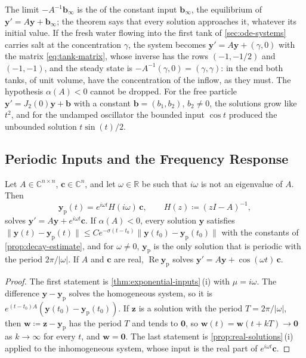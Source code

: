 The limit $-A^{-1}\mathbf b_\infty$ is the  of the constant input $\mathbf b_\infty$, the equilibrium of $\mathbf y'=A\mathbf y+\mathbf b_\infty$; the theorem says that every solution approaches it, whatever its initial value. If the fresh water flowing into the first tank of \cref{sec:ode-systems} carries salt at the concentration $\gamma$, the system becomes $\mathbf y'=A\mathbf y+(\gamma,0)$ with the matrix \eqref{eq:tank-matrix}, whose inverse has the rows $(-1,-1/2)$ and $(-1,-1)$, and the steady state is $-A^{-1}(\gamma,0)=(\gamma,\gamma)$: in the end both tanks, of unit volume, have the concentration of the inflow, as they must. The hypothesis $\alpha(A)<0$ cannot be dropped. For the free particle $\mathbf y'=J_2(0)\mathbf y+\mathbf b$ with a constant $\mathbf b=(b_1,b_2)$, $b_2\ne0$, the solutions grow like $t^2$, and for the undamped oscillator the bounded input $\cos t$ produced the unbounded solution $t\sin(t)/2$.

\subsection{Periodic Inputs and the Frequency Response}

\begin{theorem}
\label{thm:periodic-response}
Let $A\in\mathbb C^{n\times n}$, $\mathbf c\in\mathbb C^n$, and let $\omega\in\mathbb R$ be such that $i\omega$ is not an eigenvalue of $A$. Then
\[
\mathbf y_{\mathrm p}(t)=e^{i\omega t}H(i\omega)\,\mathbf c,\qquad H(z)\coloneqq(zI-A)^{-1},
\]
solves $\mathbf y'=A\mathbf y+e^{i\omega t}\mathbf c$. If $\alpha(A)<0$, every solution $\mathbf y$ satisfies $\|\mathbf y(t)-\mathbf y_{\mathrm p}(t)\|\le Ce^{-\sigma(t-t_0)}\|\mathbf y(t_0)-\mathbf y_{\mathrm p}(t_0)\|$ with the constants of \cref{prop:decay-estimate}, and for $\omega\ne0$, $\mathbf y_{\mathrm p}$ is the only solution that is periodic with the period $2\pi/|\omega|$. If $A$ and $\mathbf c$ are real, $\operatorname{Re}\mathbf y_{\mathrm p}$ solves $\mathbf y'=A\mathbf y+\cos(\omega t)\,\mathbf c$.
\end{theorem}

\begin{proof}
The first statement is \cref{thm:exponential-inputs}\,(i) with $\mu=i\omega$. The difference $\mathbf y-\mathbf y_{\mathrm p}$ solves the homogeneous system, so it is $e^{(t-t_0)A}(\mathbf y(t_0)-\mathbf y_{\mathrm p}(t_0))$. If $\mathbf z$ is a solution with the period $T=2\pi/|\omega|$, then $\mathbf w\coloneqq\mathbf z-\mathbf y_{\mathrm p}$ has the period $T$ and tends to $\mathbf 0$, so $\mathbf w(t)=\mathbf w(t+kT)\to\mathbf 0$ as $k\to\infty$ for every $t$, and $\mathbf w=\mathbf 0$. The last statement is \cref{prop:real-solutions}\,(i) applied to the inhomogeneous system, whose input is the real part of $e^{i\omega t}\mathbf c$.
\end{proof}

